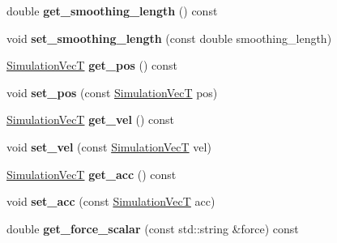 \begin{DoxyCompactItemize}
\item 
\mbox{\label{classwash_1_1Particle_aab02f56502c6521382cf7a7320abc341}} 
double {\bfseries get\+\_\+smoothing\+\_\+length} () const
\item 
\mbox{\label{classwash_1_1Particle_a15892a4346c05de955f91087dc88786d}} 
void {\bfseries set\+\_\+smoothing\+\_\+length} (const double smoothing\+\_\+length)
\item 
\mbox{\label{classwash_1_1Particle_a9d222d453d640cf629ee8dfbee6b43c2}} 
\mbox{\hyperlink{classwash_1_1Vec}{Simulation\+VecT}} {\bfseries get\+\_\+pos} () const
\item 
\mbox{\label{classwash_1_1Particle_af06835533935c04e594c258a7dcdd1ef}} 
void {\bfseries set\+\_\+pos} (const \mbox{\hyperlink{classwash_1_1Vec}{Simulation\+VecT}} pos)
\item 
\mbox{\label{classwash_1_1Particle_a890d0f1467225393e385872b0c98b974}} 
\mbox{\hyperlink{classwash_1_1Vec}{Simulation\+VecT}} {\bfseries get\+\_\+vel} () const
\item 
\mbox{\label{classwash_1_1Particle_a4755365883cfd62117ebe74fe44d35e0}} 
void {\bfseries set\+\_\+vel} (const \mbox{\hyperlink{classwash_1_1Vec}{Simulation\+VecT}} vel)
\item 
\mbox{\label{classwash_1_1Particle_afb8c9dce2692cdfab61a3a87fde50610}} 
\mbox{\hyperlink{classwash_1_1Vec}{Simulation\+VecT}} {\bfseries get\+\_\+acc} () const
\item 
\mbox{\label{classwash_1_1Particle_a395e095de0b2af7dfc925bedef2090a1}} 
void {\bfseries set\+\_\+acc} (const \mbox{\hyperlink{classwash_1_1Vec}{Simulation\+VecT}} acc)
\item 
\mbox{\label{classwash_1_1Particle_ab42a162b41a4e8cf6212bd9c43f3a0cf}} 
double {\bfseries get\+\_\+force\+\_\+scalar} (const std\+::string \&force) const
\item 
\mbox{\label{classwash_1_1Particle_a2c3038c8eac34e371922bcf1ab79b8ca}} 

\end{DoxyCompactItemize}
